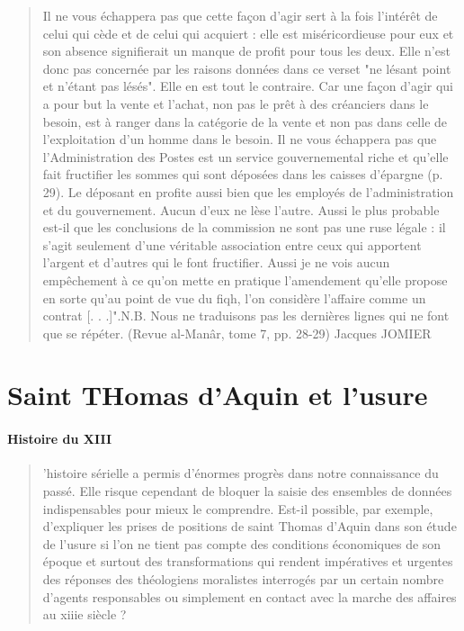 \begin{quote}
Il ne vous échappera pas que cette façon d'agir sert à la fois l'intérêt de celui
qui cède et de celui qui acquiert : elle est miséricordieuse pour eux et son absence
signifierait un manque de profit pour tous les deux. Elle n'est donc pas concernée
par les raisons données dans ce verset "ne lésant point et n'étant pas lésés". Elle
en est tout le contraire. Car une façon d'agir qui a pour but la vente et l'achat,
non pas le prêt à des créanciers dans le besoin, est à ranger dans la catégorie de la
vente et non pas dans celle de l'exploitation d'un homme dans le besoin. Il ne
vous échappera pas que l'Administration des Postes est un service gouvernemental
riche et qu'elle fait fructifier les sommes qui sont déposées dans les caisses
d'épargne (p. 29). Le déposant en profite aussi bien que les employés de
l'administration et du gouvernement. Aucun d'eux ne lèse l'autre. Aussi le plus probable
est-il que les conclusions de la commission ne sont pas une ruse légale : il s'agit
seulement d'une véritable association entre ceux qui apportent l'argent et d'autres
qui le font fructifier. Aussi je ne vois aucun empêchement à ce qu'on mette en
pratique l'amendement qu'elle propose en sorte qu'au point de vue du fiqh, l'on
considère l'affaire comme un contrat [. . .]".N.B. Nous ne traduisons pas les
dernières lignes qui ne font que se répéter.
(Revue al-Manâr, tome 7, pp. 28-29)
Jacques JOMIER
 \end{quote}
 
 \section{Saint THomas d'Aquin et l'usure}
 \cite{Sivery:UsureThomasAquin}
 
 
 \paragraph{Histoire du XIII}
 \begin{quote}
     ’histoire sérielle a permis d’énormes progrès dans notre connaissance du passé. Elle risque cependant de bloquer la saisie des ensembles de données indispensables pour mieux le comprendre. Est-il possible, par exemple, d’expliquer les prises de positions de saint Thomas d’Aquin dans son étude de l’usure si l’on ne tient pas compte des conditions économiques de son époque et surtout des transformations qui rendent impératives et urgentes des réponses des théologiens moralistes interrogés par un certain nombre d’agents responsables ou simplement en contact avec la marche des affaires au xiiie siècle ? 
 \end{quote}
 
